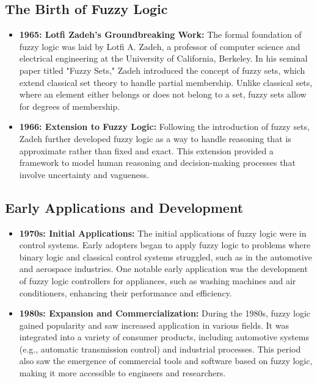 \documentclass[12pt,a4paper]{article}
\begin{document}
\subsection*{The Birth of Fuzzy Logic}
\begin{itemize}

\item \textbf{1965: Lotfi Zadeh’s Groundbreaking Work:} The formal foundation of fuzzy logic was laid by Lotfi A. Zadeh, a professor of computer science and electrical engineering at the University of California, Berkeley. In his seminal paper titled "Fuzzy Sets," Zadeh introduced the concept of fuzzy sets, which extend classical set theory to handle partial membership. Unlike classical sets, where an element either belongs or does not belong to a set, fuzzy sets allow for degrees of membership.

\item \textbf{1966: Extension to Fuzzy Logic:} Following the introduction of fuzzy sets, Zadeh further developed fuzzy logic as a way to handle reasoning that is approximate rather than fixed and exact. This extension provided a framework to model human reasoning and decision-making processes that involve uncertainty and vagueness.
\end{itemize}

\subsection*{Early Applications and Development}
\begin{itemize}

\item \textbf{1970s: Initial Applications:} The initial applications of fuzzy logic were in control systems. Early adopters began to apply fuzzy logic to problems where binary logic and classical control systems struggled, such as in the automotive and aerospace industries. One notable early application was the development of fuzzy logic controllers for appliances, such as washing machines and air conditioners, enhancing their performance and efficiency.

\item \textbf{1980s: Expansion and Commercialization:} During the 1980s, fuzzy logic gained popularity and saw increased application in various fields. It was integrated into a variety of consumer products, including automotive systems (e.g., automatic transmission control) and industrial processes. This period also saw the emergence of commercial tools and software based on fuzzy logic, making it more accessible to engineers and researchers.

\end{itemize}
\end{document}

